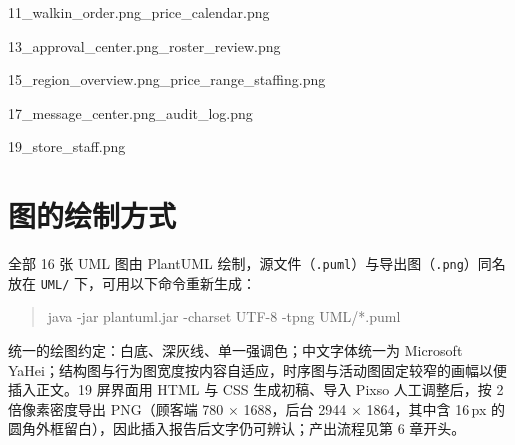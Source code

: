{\noindent\hspace*{4em}11\_walkin\_order.png\_price\_calendar.png\par
\noindent\hspace*{4em}13\_approval\_center.png\_roster\_review.png\par
\noindent\hspace*{4em}15\_region\_overview.png\_price\_range\_staffing.png\par
\noindent\hspace*{4em}17\_message\_center.png\_audit\_log.png\par
\noindent\hspace*{4em}19\_store\_staff.png\par
}

\section{图的绘制方式}

全部 16 张 UML 图由 PlantUML 绘制，源文件（\texttt{.puml}）与导出图（\texttt{.png}）同名放在 \texttt{UML/} 下，可用以下命令重新生成：

\begin{quote}
\ttfamily
java -jar plantuml.jar -charset UTF-8 -tpng UML/*.puml
\end{quote}

统一的绘图约定：白底、深灰线、单一强调色；中文字体统一为 Microsoft YaHei；结构图与行为图宽度按内容自适应，时序图与活动图固定较窄的画幅以便插入正文。19 屏界面用 HTML 与 CSS 生成初稿、导入 Pixso 人工调整后，按 2 倍像素密度导出 PNG（顾客端 780 $\times$ 1688，后台 2944 $\times$ 1864，其中含 16\,px 的圆角外框留白），因此插入报告后文字仍可辨认；产出流程见第 6 章开头。
